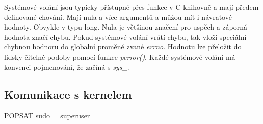 Systémové volání\cite{LinuxKernelDevelopment} jsou typicky přístupné přes funkce v C knihovně a mají předem definované chování. Mají nula
a více argumentů a můžou mít i návratové hodnoty. Obvykle v typu long. Nula je většinou značení pro uspěch a záporná hodnota značí chybu.
Pokud systémové volání vrátí chybu, tak vloží speciální chybnou hodnoru do globalní proměné zvané \emph{errno}. Hodnotu lze přeložit do
lidsky čitelné podoby pomocí funkce \emph{perror()}. Každé systémové volání má konvenci pojmenování, že začíná s \emph{sys_}.

\subsection*{Komunikace s kernelem}




POPSAT sudo = superuser